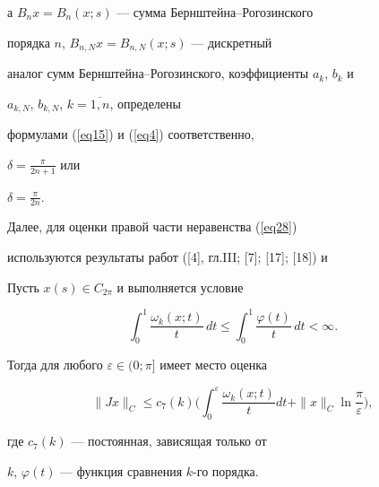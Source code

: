 а $B_nx=B_n(x;s)$ --- сумма Бернштейна--Рогозинского


порядка $n$, $B_{n,N}x=B_{n,N}(x;s)$ --- дискретный


аналог сумм Бернштейна--Рогозинского, коэффициенты $a_k$, $b_k$ и


$a_{k,N}$, $b_{k,N}$, $k=\overline{1,n}$, определены


формулами (\ref{eq15}) и (\ref{eq4}) соответственно,


$\delta=\frac{\pi}{2n+1}$ или


$\delta=\frac{\pi}{2n}$.





Далее, для оценки правой части неравенства (\ref{eq28})


используются результаты работ ([4], гл.III; [7]; [17]; [18]) и








\begin{lem}


Пусть $x(s)\in C_{2\pi}$ и выполняется условие


$$




\int_0^1\frac{\omega_k(x;t)}{t}\, dt


\leq\int_0^1\frac{\varphi(t)}{t}\, dt <\infty.




$$


Тогда для любого $\varepsilon\in(0;\pi]$ имеет место оценка


\begin{equation}\label{eq30}


\|Jx\|_C\leq


c_7(k)\bigg(\int_0^\varepsilon


\frac{\omega_k(x;t)}{t}dt +


\|x\|_C\ln\frac{\pi}{\varepsilon}\bigg),


\end{equation}


где $c_7(k)$ --- постоянная, зависящая только от


$k$, $\varphi(t)$ --- функция сравнения $k$-го порядка.


\end{lem}








